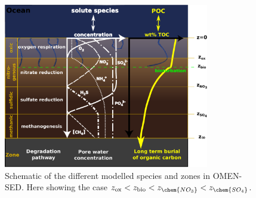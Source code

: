 \documentclass[gmd, manuscript]{copernicus}
\begin{document}
\begin{figure}[htbp]
\begin{center}
	\includegraphics[width=0.8\textwidth]{figures/Sediment-model-with-profiles.pdf}
	\caption{Schematic of the different modelled species and zones in OMEN-SED. Here showing the case $z_{\mathrm{ox}} < z_{\mathrm{bio}} < z_{\chem{NO_3}} < z_{\chem{SO_4}}$.}
	\label{fig:Sediment_layers}
	\end{center}
\end{figure}
\end{document}
